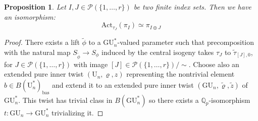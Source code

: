 \documentclass[reqno,11pt]{amsart}
\newtheorem{proposition}[theorem]{Proposition}
\theoremstyle{remark}
\newcommand{\GU}{\mathrm{GU}}
\newcommand{\U}{\mathrm{U}}
\newcommand{\mc}{\mathcal}
\newcommand{\Q}{\mathbb{Q}}
\newcommand{\bas}{\mathrm{bas}}
\newcommand{\Act}{\mathrm{Act}}
\def\ra{\rightarrow}
\begin{document}
\begin{proposition}{\label{prop: Unallactval}}
Let $I,J \in \mc{P}(\{1,\ldots,r\})$ be two finite index sets. Then we have an isomorphism:
\[ \Act_{\tau_{J}}(\pi_{I}) \simeq \pi_{I \oplus J} \]
\end{proposition}
\begin{proof}
There exists a lift $\tilde{\phi}$ to a $\GU^*_{n}$-valued parameter such that precomposition with the natural map $S_{\tilde{\phi}} \ra S_{\phi}$ induced by the central isogeny takes $\tau_{J}$ to $\tilde{\tau}_{[J],0}$, for $J \in \mc{P}(\{1,\ldots,r\})$ with image $[J] \in \mc{P}(\{1,\ldots,r\})/\sim$. Choose also an extended pure inner twist $(\U_n, \varrho, z)$ representing the nontrivial element $b \in B(\U^*_n)_{\bas}$ and extend it to an extended pure inner twist $(\GU_n, \tilde{\varrho}, \tilde{z})$ of $\GU^*_n$. This twist has trivial class in $B(\GU^*_n)$ so there exists a $\Q_p$-isomorphism $t: \GU_n \to \GU_n^*$ trivializing it.


\end{proof}
\end{document}

